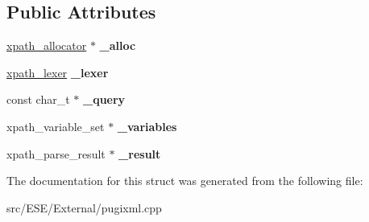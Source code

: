 \subsection*{Public Attributes}
\begin{DoxyCompactItemize}
\item 
\hypertarget{structxpath__parser_ac34f5b21ef406bec944286eee2f45836}{\hyperlink{classxpath__allocator}{xpath\-\_\-allocator} $\ast$ {\bfseries \-\_\-alloc}}\label{structxpath__parser_ac34f5b21ef406bec944286eee2f45836}

\item 
\hypertarget{structxpath__parser_a50106db584946e67acd080ef5391a0f4}{\hyperlink{classxpath__lexer}{xpath\-\_\-lexer} {\bfseries \-\_\-lexer}}\label{structxpath__parser_a50106db584946e67acd080ef5391a0f4}

\item 
\hypertarget{structxpath__parser_aaf5ea5d5be97cdd93adc7a719d8edc1c}{const char\-\_\-t $\ast$ {\bfseries \-\_\-query}}\label{structxpath__parser_aaf5ea5d5be97cdd93adc7a719d8edc1c}

\item 
\hypertarget{structxpath__parser_a3e0adfea7cc81c08b97ee1375831df6c}{xpath\-\_\-variable\-\_\-set $\ast$ {\bfseries \-\_\-variables}}\label{structxpath__parser_a3e0adfea7cc81c08b97ee1375831df6c}

\item 
\hypertarget{structxpath__parser_a9370fb875bfc49ca6e35f3165ecb1692}{xpath\-\_\-parse\-\_\-result $\ast$ {\bfseries \-\_\-result}}\label{structxpath__parser_a9370fb875bfc49ca6e35f3165ecb1692}

\end{DoxyCompactItemize}


The documentation for this struct was generated from the following file\-:\begin{DoxyCompactItemize}
\item 
src/\-E\-S\-E/\-External/pugixml.\-cpp\end{DoxyCompactItemize}
